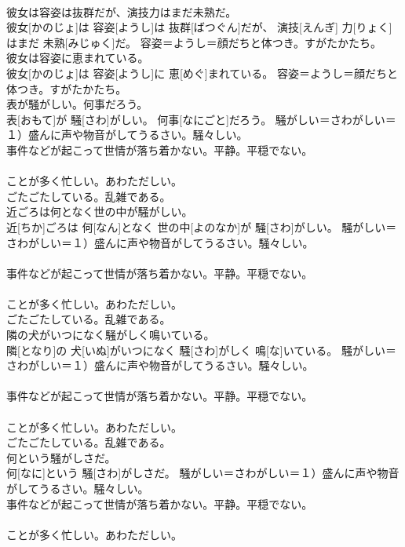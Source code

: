 \documentclass[8pt]{extreport}
\begin{document}
\begin{CJK}{UTF8}{min}
{\\	彼女は容姿は抜群だが、演技力はまだ未熟だ。	
\\	彼女[かのじょ]は 容姿[ようし]は 抜群[ばつぐん]だが、 演技[えんぎ] 力[りょく]はまだ 未熟[みじゅく]だ。	容姿＝ようし＝顔だちと体つき。すがたかたち。
\\	彼女は容姿に恵まれている。	
\\	彼女[かのじょ]は 容姿[ようし]に 恵[めぐ]まれている。	容姿＝ようし＝顔だちと体つき。すがたかたち。
\\	表が騒がしい。何事だろう。	
\\	表[おもて]が 騒[さわ]がしい。 何事[なにごと]だろう。	騒がしい＝さわがしい＝１）盛んに声や物音がしてうるさい。騒々しい。 　　　　　　　　　　　
\\	事件などが起こって世情が落ち着かない。平静。平穏でない。 　　　　　　　　　　　
\\	ことが多く忙しい。あわただしい。 　　　　　　　　　　　
\\	ごたごたしている。乱雑である。
\\	近ごろは何となく世の中が騒がしい。	
\\	近[ちか]ごろは 何[なん]となく 世の中[よのなか]が 騒[さわ]がしい。	騒がしい＝さわがしい＝１）盛んに声や物音がしてうるさい。騒々しい。 　　　　　　　　　　　
\\	事件などが起こって世情が落ち着かない。平静。平穏でない。 　　　　　　　　　　　
\\	ことが多く忙しい。あわただしい。 　　　　　　　　　　　
\\	ごたごたしている。乱雑である。
\\	隣の犬がいつになく騒がしく鳴いている。	
\\	隣[となり]の 犬[いぬ]がいつになく 騒[さわ]がしく 鳴[な]いている。	騒がしい＝さわがしい＝１）盛んに声や物音がしてうるさい。騒々しい。 　　　　　　　　　　　
\\	事件などが起こって世情が落ち着かない。平静。平穏でない。 　　　　　　　　　　　
\\	ことが多く忙しい。あわただしい。 　　　　　　　　　　　
\\	ごたごたしている。乱雑である。
\\	何という騒がしさだ。	
\\	何[なに]という 騒[さわ]がしさだ。	騒がしい＝さわがしい＝１）盛んに声や物音がしてうるさい。騒々しい。 　　　　　　　　　　　
\\	事件などが起こって世情が落ち着かない。平静。平穏でない。 　　　　　　　　　　　
\\	ことが多く忙しい。あわただしい。 　　　　　　　　　　　
}
\end{CJK}
\end{document}
